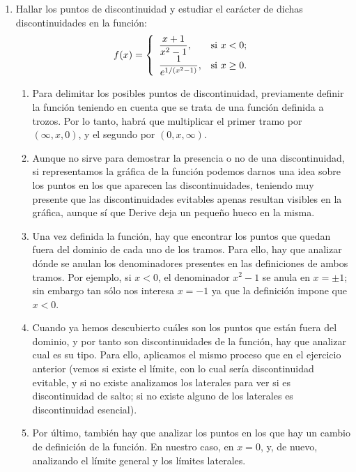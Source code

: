 \begin{enumerate}[leftmargin=*]
\item  Hallar los puntos de discontinuidad y estudiar el carácter
de dichas discontinuidades en la función:
\[
f(x)=
\left\{
\begin{array}{ll}
\dfrac{x+1}{x^2-1}, & \hbox{si $x<0$;} \\
\dfrac{1}{e^{1/(x^2-1)}}, & \hbox{si $x\geq 0$.} \\
\end{array}
\right.
\]

\begin{indicacion}
\begin{enumerate}
\item Para delimitar los posibles puntos de discontinuidad, previamente definir la función teniendo en cuenta que se trata de una función
definida a trozos. Por lo tanto, habrá que multiplicar el primer tramo por $(\infty,x,0)$, y el segundo por
$(0,x,\infty)$.
\item Aunque no sirve para demostrar la presencia o no de una discontinuidad, si representamos la gráfica de la función podemos darnos una
idea sobre los puntos en los que aparecen las discontinuidades, teniendo muy presente que las discontinuidades evitables apenas resultan
visibles en la gráfica, aunque sí que Derive deja un pequeño hueco en la misma.
\item Una vez definida la función, hay que encontrar los puntos que quedan fuera del dominio de cada uno de los tramos. Para ello, hay que
analizar dónde se anulan los denominadores presentes en las definiciones de ambos tramos. Por ejemplo, si $x<0$, el denominador $x^2-1$ se
anula en $x=\pm1$; sin embargo tan sólo nos interesa $x=-1$ ya que la definición impone que $x<0$.
\item Cuando ya hemos descubierto cuáles son los puntos que están fuera del dominio, y por tanto son discontinuidades de la función, hay que
analizar cual es su tipo. Para ello, aplicamos el mismo proceso que en el ejercicio anterior (vemos si existe el límite, con lo cual sería
discontinuidad evitable, y si no existe analizamos los laterales para ver si es discontinuidad de salto; si no existe alguno de los
laterales es discontinuidad esencial).
\item Por último, también hay que analizar los puntos en los que hay un cambio de definición de la función. En nuestro caso, en $x=0$, y, de
nuevo, analizando el límite general y los límites laterales.
\end{enumerate}
\end{indicacion}

\end{enumerate}


